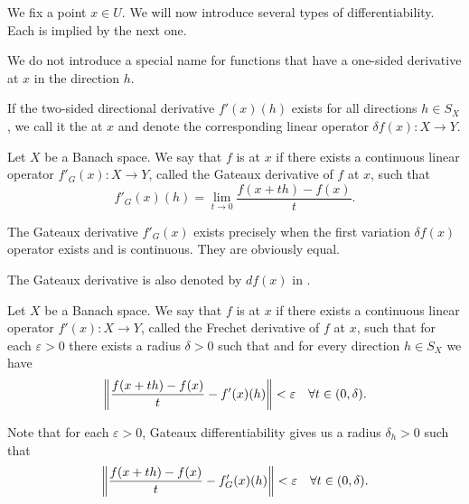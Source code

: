 \begin{definition}\label{def:differentiability}
  We fix a point \( x \in U \). We will now introduce several types of differentiability. Each is implied by the next one.

  \begin{defenum}
     We do not introduce a special name for functions that have a one-sided derivative at \( x \) in the direction \( h \).

    \cite[0.2.1]{Йоффе1974} If the two-sided directional derivative \( f'(x)(h) \) exists for all directions \( h \in S_X \), we call it the  at \( x \) and denote the corresponding linear operator \( \delta f(x): X \to Y \).

    \cite[definition 1.12]{Phelps1993} Let \( X \) be a Banach space. We say that \( f \) is  at \( x \) if there exists a continuous linear operator \( f'_G(x): X \to Y \), called the Gateaux derivative of \( f \) at \( x \), such that
    \begin{equation*}
      f'_G(x)(h) = \lim_{t \to 0} \frac {f(x + th) - f(x)} t.
    \end{equation*}

    The Gateaux derivative \( f'_G(x) \) exists precisely when the first variation \( \delta f(x) \) operator exists and is continuous. They are obviously equal.

    The Gateaux derivative is also denoted by \( df(x) \) in \cite[definition 1.12]{Phelps1993}.

    \cite[definition 1.12]{Phelps1993} Let \( X \) be a Banach space. We say that \( f \) is  at \( x \) if there exists a continuous linear operator \( f'(x): X \to Y \), called the Frechet derivative of \( f \) at \( x \), such that for each \( \varepsilon > 0 \) there exists a radius \( \delta > 0 \) such that and for every direction \( h \in S_X \) we have
    \begin{equation*}
      \left\Vert  \frac {f(x + th) - f(x)} t - f'(x)(h) \right\Vert < \varepsilon \quad\forall t \in (0, \delta).
    \end{equation*}

    Note that for each \( \varepsilon > 0 \), Gateaux differentiability gives us a radius \( \delta_h > 0 \) such that
    \begin{equation*}
      \left\Vert  \frac {f(x + th) - f(x)} t - f_G'(x)(h) \right\Vert < \varepsilon \quad\forall t \in (0, \delta).
    \end{equation*}


\end{defenum}
\end{definition}
